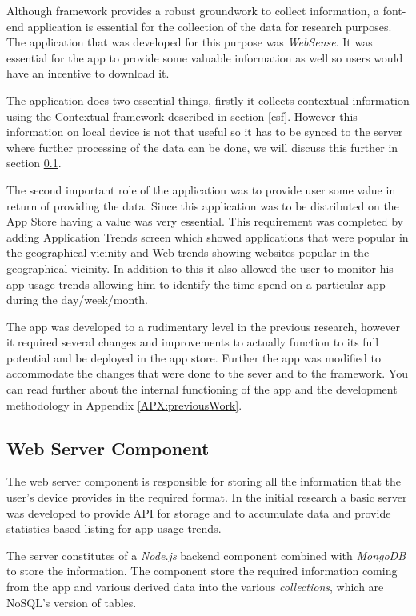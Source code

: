 \documentclass[prodmode,acmtecs]{acmsmall}
\begin{document}
Although framework provides a robust groundwork to collect information, a font-end application is essential for the collection of the data for research purposes. The application that was developed for this purpose was \textit{WebSense}. It was essential for the app to provide some valuable information as well so users would have an incentive to download it.

The application does two essential things, firstly it collects contextual information using the Contextual framework described in section \ref{csf}. However this information on local device is not that useful so it has to be synced to the server where further processing of the data can be done, we will discuss this further in section \ref{ws}.

The second important role of the application was to provide user some value in return of providing the data. Since this application was to be distributed on the App Store having a value was very essential. This requirement was completed by adding Application Trends screen which showed applications that were popular in the geographical vicinity and Web trends showing websites popular in the geographical vicinity. In addition to this it also allowed the user to monitor his app usage trends allowing him to identify the time spend on a particular app during the day/week/month.

The app was developed to a rudimentary level in the previous research, however it required several changes and improvements to actually function to its full potential and be deployed in the app store. Further the app was modified to accommodate the changes that were done to the sever and to the framework. You can read further about the internal functioning of the app and the development methodology in Appendix \ref{APX:previousWork}.

\subsection{Web Server Component}
\label{ws}

The web server component is responsible for storing all the information that the user's device provides in the required format. In the initial research a basic server was developed to provide API for storage and to accumulate data and provide statistics based listing for app usage trends.

The server constitutes of a \textit{Node.js} backend component combined with \textit{MongoDB} to store the information. The component store the required information coming from the app and various derived data into the various \textit{collections}, which are NoSQL's version of tables.
\end{document}
